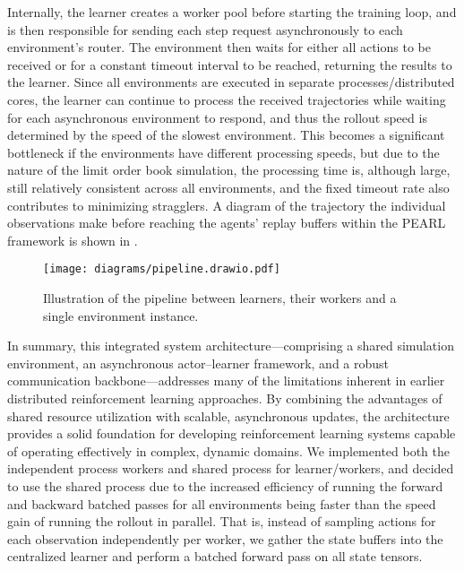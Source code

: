     Internally, the learner creates a worker pool before starting the training loop, and is then responsible
    for sending each step request asynchronously to each environment's router.
    The environment then waits for either all actions to be received or for a constant timeout interval to be reached, returning the results to the learner.
    Since all environments are executed in separate processes/distributed cores, the learner can continue to process the
    received trajectories while waiting for each asynchronous environment to respond,
    and thus the rollout speed is determined by the speed of the slowest environment.
    This becomes a significant bottleneck if the environments have different processing speeds,
    but due to the nature of the limit order book simulation, the processing time is, although large,
    still relatively consistent across all environments, and the fixed timeout rate also contributes to minimizing stragglers.
    A diagram of the trajectory the individual observations make before reaching the agents' replay buffers within the PEARL framework
    is shown in .

    \begin{figure}
        \centering
        \texttt{[image: diagrams/pipeline.drawio.pdf]}
        \caption{Illustration of the pipeline between learners, their workers and a single environment instance.}
        \label{fig:pipeline}
    \end{figure}

    In summary, this integrated system architecture—comprising a shared simulation environment, an asynchronous actor–learner framework, and
    a robust communication backbone—addresses many of the limitations inherent in earlier distributed reinforcement learning approaches.
    By combining the advantages of shared resource utilization with scalable, asynchronous updates, the architecture provides a solid foundation for
    developing reinforcement learning systems capable of operating effectively in complex, dynamic domains.
    We implemented both the independent process workers and shared process for learner/workers,
    and decided to use the shared process due to the increased efficiency of running the forward and backward batched passes
    for all environments being faster than the speed gain of running the rollout in parallel.
    That is, instead of sampling actions for each observation independently per worker,
    we gather the state buffers into the centralized learner and perform a batched forward pass on all state tensors.

